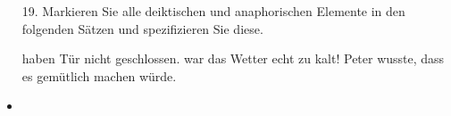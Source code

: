 
\begin{frame}

\begin{itemize}
	\item[19.] Markieren Sie alle deiktischen und anaphorischen Elemente in den folgenden Sätzen und spezifizieren Sie diese.
	
	\begin{exe}
		
		\begin{xlist}
			\ex {} haben  Tür nicht geschlossen.
			\ex {} war  das Wetter echt zu kalt!
			\ex Peter wusste, dass  es   gemütlich machen würde. 
		\end{xlist}
	
	\end{exe}

\end{itemize}	
	
	\begin{minipage}[t]{0.35\textwidth}

	\begin{itemize}
		\item {}

	\end{itemize}
	
	\end{minipage}
	\begin{minipage}[t]{0.60\textwidth}
	

\end{minipage}
\end{frame}
